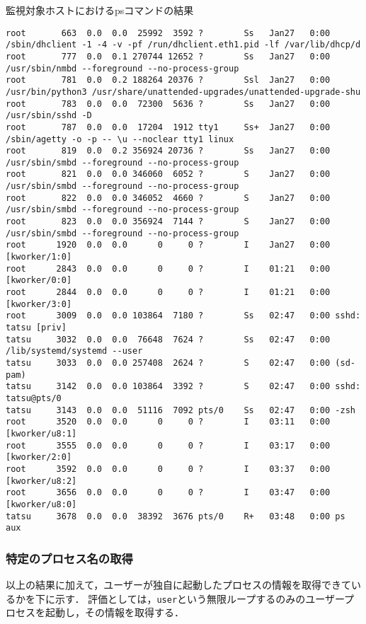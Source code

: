 \begin{itembox}[l]{監視対象ホストにおけるpsコマンドの結果}
\begin{verbatim}
root       663  0.0  0.0  25992  3592 ?        Ss   Jan27   0:00 /sbin/dhclient -1 -4 -v -pf /run/dhclient.eth1.pid -lf /var/lib/dhcp/d
root       777  0.0  0.1 270744 12652 ?        Ss   Jan27   0:00 /usr/sbin/nmbd --foreground --no-process-group
root       781  0.0  0.2 188264 20376 ?        Ssl  Jan27   0:00 /usr/bin/python3 /usr/share/unattended-upgrades/unattended-upgrade-shu
root       783  0.0  0.0  72300  5636 ?        Ss   Jan27   0:00 /usr/sbin/sshd -D
root       787  0.0  0.0  17204  1912 tty1     Ss+  Jan27   0:00 /sbin/agetty -o -p -- \u --noclear tty1 linux
root       819  0.0  0.2 356924 20736 ?        Ss   Jan27   0:00 /usr/sbin/smbd --foreground --no-process-group
root       821  0.0  0.0 346060  6052 ?        S    Jan27   0:00 /usr/sbin/smbd --foreground --no-process-group
root       822  0.0  0.0 346052  4660 ?        S    Jan27   0:00 /usr/sbin/smbd --foreground --no-process-group
root       823  0.0  0.0 356924  7144 ?        S    Jan27   0:00 /usr/sbin/smbd --foreground --no-process-group
root      1920  0.0  0.0      0     0 ?        I    Jan27   0:00 [kworker/1:0]
root      2843  0.0  0.0      0     0 ?        I    01:21   0:00 [kworker/0:0]
root      2844  0.0  0.0      0     0 ?        I    01:21   0:00 [kworker/3:0]
root      3009  0.0  0.0 103864  7180 ?        Ss   02:47   0:00 sshd: tatsu [priv]
tatsu     3032  0.0  0.0  76648  7624 ?        Ss   02:47   0:00 /lib/systemd/systemd --user
tatsu     3033  0.0  0.0 257408  2624 ?        S    02:47   0:00 (sd-pam)
tatsu     3142  0.0  0.0 103864  3392 ?        S    02:47   0:00 sshd: tatsu@pts/0
tatsu     3143  0.0  0.0  51116  7092 pts/0    Ss   02:47   0:00 -zsh
root      3520  0.0  0.0      0     0 ?        I    03:11   0:00 [kworker/u8:1]
root      3555  0.0  0.0      0     0 ?        I    03:17   0:00 [kworker/2:0]
root      3592  0.0  0.0      0     0 ?        I    03:37   0:00 [kworker/u8:2]
root      3656  0.0  0.0      0     0 ?        I    03:47   0:00 [kworker/u8:0]
tatsu     3678  0.0  0.0  38392  3676 pts/0    R+   03:48   0:00 ps aux
    \end{verbatim}
\end{itembox}

\subsubsection{特定のプロセス名の取得}

以上の結果に加えて，ユーザーが独自に起動したプロセスの情報を取得できているかを下に示す．
評価としては，\verb|user|という無限ループするのみのユーザープロセスを起動し，その情報を取得する．

